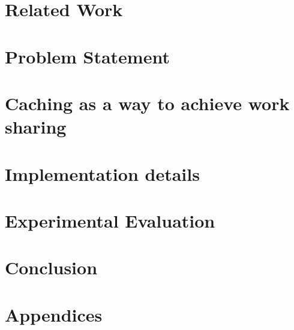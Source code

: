 \documentclass{acmsig}
\begin{document}
\section{Related Work}
\label{sec:related}


\section{Problem Statement}
\label{sec:problem}


\section{Caching as a way to achieve work sharing}
\label{sec:caching}


\section{Implementation details}
\label{sec:implementation}


\section{Experimental Evaluation}
\label{sec:evaluation}


\section{Conclusion}
\label{sec:conclusion}






\section{Appendices}
\label{sec:appendices}

\end{document}
